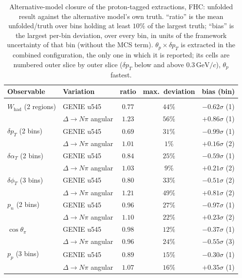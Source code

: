 \documentclass[11pt,a4paper]{article}
\newcommand{\GeVc}{\,\text{GeV}\!/c}
\begin{document}
\begin{table}[H]
  \centering
  \caption{Alternative-model closure of the proton-tagged extractions, FHC: unfolded result against the
    alternative model's own truth. ``ratio'' is the mean unfolded/truth over bins holding at least $10\%$
    of the largest truth; ``bias'' is the largest per-bin deviation, over every bin, in units of the
    framework uncertainty of that bin (without the MCS term). $\theta_p\times\delta p_T$ is extracted in the combined configuration, the only one
    in which it is reported; its cells are numbered outer slice by outer slice ($\delta p_T$ below and above
    $0.3\GeVc$), $\theta_p$ fastest.}
  \label{tab:pt_altmodel}
  \small
  \begin{tabular}{llccc}
    \toprule
    Observable & Variation & ratio & max.\ deviation & bias (bin) \\
    \midrule
    \multicolumn{5}{l}{} \\
    $W_\mathrm{had}$ (2 regions) & GENIE u545 & $0.77$ & $44\%$ & $-0.62\sigma$ (1) \\
                     & $\Delta\to N\pi$ angular & $1.23$ & $56\%$ & $+0.86\sigma$ (1) \\
    $\delta p_T$ (2 bins) & GENIE u545 & $0.69$ & $31\%$ & $-0.99\sigma$ (1) \\
                     & $\Delta\to N\pi$ angular & $1.01$ & $1\%$ & $+0.16\sigma$ (2) \\
    $\delta\alpha_T$ (2 bins) & GENIE u545 & $0.84$ & $25\%$ & $-0.59\sigma$ (1) \\
                     & $\Delta\to N\pi$ angular & $1.03$ & $9\%$ & $+0.21\sigma$ (2) \\
    $\delta\phi_T$ (3 bins) & GENIE u545 & $0.80$ & $33\%$ & $-0.51\sigma$ (2) \\
                     & $\Delta\to N\pi$ angular & $1.21$ & $49\%$ & $+0.81\sigma$ (2) \\
    $p_n$ (2 bins) & GENIE u545 & $0.96$ & $27\%$ & $-0.97\sigma$ (1) \\
                     & $\Delta\to N\pi$ angular & $1.10$ & $22\%$ & $+0.23\sigma$ (2) \\
    $\cos\theta_\pi$ & GENIE u545 & $0.98$ & $12\%$ & $-0.37\sigma$ (1) \\
                     & $\Delta\to N\pi$ angular & $0.96$ & $24\%$ & $-0.55\sigma$ (3) \\
    $p_p$ (3 bins) & GENIE u545 & $0.89$ & $15\%$ & $-0.30\sigma$ (1) \\
                     & $\Delta\to N\pi$ angular & $1.07$ & $16\%$ & $+0.35\sigma$ (1) \\

\end{tabular}
\end{table}
\end{document}
